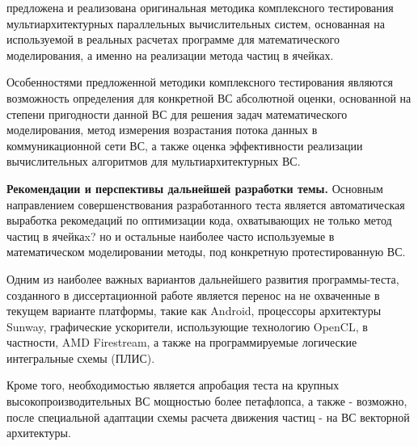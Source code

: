 предложена и реализована оригинальная методика комплексного тестирования мультиархитектурных параллельных вычислительных систем, основанная на используемой в реальных расчетах программе для математического моделирования, а именно на реализации метода частиц в ячейках.

Особенностями предложенной методики комплексного тестирования являются возможность определения для конкретной ВС абсолютной оценки, основанной на степени пригодности данной ВС для решения задач математического моделирования, метод измерения возрастания потока данных в коммуникационной сети ВС, а также оценка эффективности реализации вычислительных алгоритмов для мультиархитектурных ВС.

\textbf{Рекомендации и перспективы дальнейшей разработки темы.}
Основным направлением совершенствования разработанного теста является автоматическая выработка рекомедаций по оптимизации кода, охватывающих не только метод частиц в ячейкаx?  но и остальные наиболее часто используемые в математическом моделировании методы,  под конкретную протестированную ВС.

Одним из наиболее важных вариантов дальнейшего развития программы-теста, созданного в диссертационной работе является перенос на не охваченные в текущем варианте платформы, такие как Android, процессоры архитектуры Sunway, графические ускорители, использующие технологию OpenCL, в частности, AMD Firestream, а также на программируемые логические интегральные схемы (ПЛИС).

Кроме того, необходимостью является апробация теста на крупных высокопроизводительных ВС мощностью более петафлопса, а также - возможно, после специальной адаптации схемы расчета движения частиц - на ВС векторной архитектуры.
